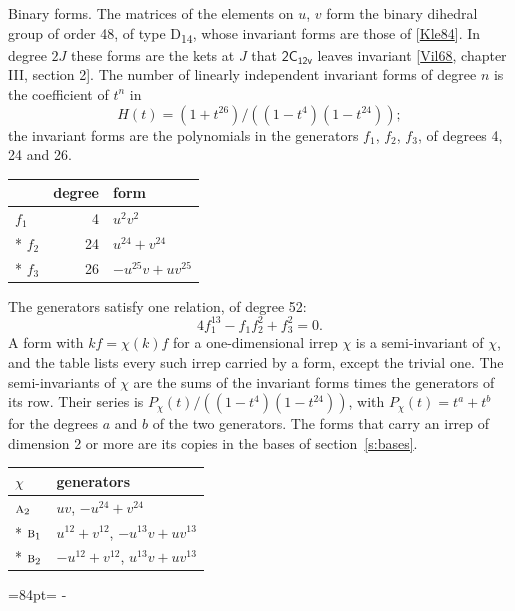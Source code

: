 \documentclass[10pt,a4paper]{article}
\makeatletter
\renewcommand\paragraph{\@startsection{paragraph}{4}{\z@}{1.5ex plus .5ex minus .2ex}{-1em}%
  {\normalfont\small\sffamily\bfseries\color{parttitle}}}
\newcommand{\needspace}[1]{\par\penalty-100\begingroup\dimen0=#1\relax\dimen2=\pagegoal
  \advance\dimen2-\pagetotal\ifdim\dimen0>\dimen2\relax\ifdim\dimen2>0pt\vfil\break\fi\fi
  \endgroup}
\numberwithin{equation}{section}
\newcommand{\grp}[1]{\mathsf{#1}}
\newcommand{\irr}[1]{\text{\normalfont\scshape #1}}
\makeatother
\begin{document}
\paragraph{Binary forms.}
The matrices of the elements on $u$, $v$ form the binary dihedral group of order 48, of type D\textsubscript{14}, whose invariant forms are those of [\href{../../../REFERENCES.pdf\#ref.Kle84}{Kle84}]. In degree $2J$ these forms are the kets at $J$ that $\grp{2C_{12v}}$ leaves invariant [\href{../../../REFERENCES.pdf\#ref.Vil68}{Vil68}, chapter III, section 2]. \label{n:head.degree}\label{n:head.form}The number of linearly independent invariant forms of degree $n$ is the coefficient of $t^n$ in
\begin{equation}\label{e:molien}H(t) = (1 + t^{26})/((1-t^{4})(1-t^{24}));\end{equation}
the invariant forms are the polynomials in the generators $f_1$, $f_2$, $f_3$, of degrees 4, 24 and 26.
{\small\begin{longtable}{@{}lrl@{}}\toprule
& degree & form\\\midrule\endhead
\bottomrule\endfoot\endlastfoot
$f_{1}$ & 4 & $u^{2}v^{2}$\\*
$f_{2}$ & 24 & $u^{24} + v^{24}$\\*
$f_{3}$ & 26 & $-u^{25}v + uv^{25}$\\
\bottomrule\end{longtable}}
The generators satisfy one relation, of degree 52:
\begin{equation}\label{e:relation}4f_{1}^{13} - f_{1}f_{2}^{2} + f_{3}^{2} = 0.\end{equation}
A form with $k f = \chi(k) f$ for a one-dimensional irrep $\chi$ is a semi-invariant of $\chi$, and the table lists every such irrep carried by a form, except the trivial one. \label{n:head.generators}The semi-invariants of $\chi$ are the sums of the invariant forms times the generators of its row. Their series is $P_\chi(t)/((1-t^{4})(1-t^{24}))$, with $P_\chi(t) = t^{a} + t^{b}$ for the degrees $a$ and $b$ of the two generators. The forms that carry an irrep of dimension 2 or more are its copies in the bases of section~\ref{s:bases}.
{\small\begin{longtable}{@{}ll@{}}\toprule
$\chi$ & generators\\\midrule\endhead
\bottomrule\endfoot\endlastfoot
$\irr{a}_{2}$ & $uv$, $-u^{24} + v^{24}$\\*
$\irr{b}_{1}$ & $u^{12} + v^{12}$, $-u^{13}v + uv^{13}$\\*
$\irr{b}_{2}$ & $-u^{12} + v^{12}$, $u^{13}v + uv^{13}$\\
\bottomrule\end{longtable}}
\needspace{84pt}
\end{document}

